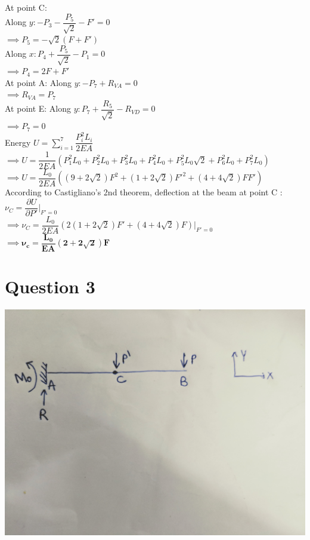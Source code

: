 \documentclass{article}
\begin{document}
\noindent At point C:\\
Along $y: -P_3-\dfrac{P_5}{\sqrt{2}}-F'=0$\\
$\implies P_5=-\sqrt{2}(F+F')$\\
Along $x: P_4+\dfrac{P_5}{\sqrt{2}}-P_1=0$\\
$\implies P_4=2F+F'$\\

\noindent At point A:
Along $y: -P_7+R_{VA}=0$\\
$\implies R_{VA}=P_7$\\

\noindent At point E:
Along $y: P_7+\dfrac{R_5}{\sqrt{2}}-R_{VD}=0$\\
$\implies P_7=0$\\

\noindent Energy $U=\sum\limits_{i=1}^7 \dfrac{P_i^2L_i}{2EA}$\\
$\implies U=\dfrac{1}{2EA}(P_1^2L_0+P_2^2L_0+P_3^2L_0+P_4^2L_0+P_5^2L_0\sqrt{2}+P_6^2L_0+P_7^2L_0)$ \\

\noindent $\implies U=\dfrac{L_0}{2EA}((9+2\sqrt{2})F^2+ (1+2\sqrt{2})F'^2 +(4+4\sqrt{2})FF')$\\

\noindent According to Castigliano's 2nd theorem, deflection at the beam at point C :\\
$\nu_C= \dfrac{\partial U}{\partial P'}\bigg \rvert_{F'=0}$\\
$\implies \nu_C=\dfrac{L_0}{2EA}(2(1+2\sqrt{2})F'+(4+4\sqrt{2})F)\Big \rvert_{F'=0}$\\

\noindent $\implies \mathbf{\nu_c=\dfrac{L_0}{EA}(2+2\sqrt{2})F}$\\

\bigbreak

\section{Question 3}

\includegraphics[scale=0.05]{Q3.jpg}
\end{document}

